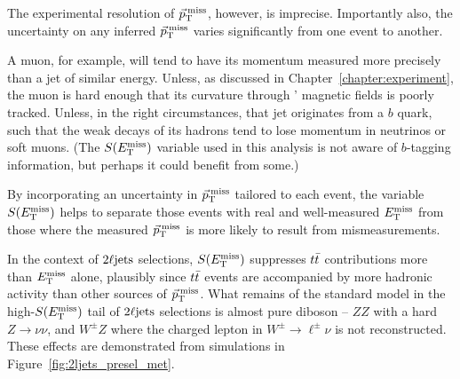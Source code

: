 The experimental resolution of $\ptmiss$, however, is imprecise.
Importantly also, the uncertainty on any inferred $\ptmiss$ varies
significantly from one event to another.

A muon, for example, will tend to have its momentum measured more precisely
than a jet of similar energy.
Unless, as discussed in Chapter~\ref{chapter:experiment}, the muon is hard
enough that its curvature through \atlas' magnetic fields is poorly tracked.
Unless, in the right circumstances, that jet originates from a $b$ quark,
such that the weak decays of its hadrons tend to lose momentum in
neutrinos or soft muons. (The $\metsig$ variable used in this analysis is not
aware of $b$-tagging information, but perhaps it could benefit from some.)

By incorporating an uncertainty in $\ptmiss$ tailored to each event, the
variable $\metsig$ helps to separate those events with real and well-measured
$\met$ from those where the measured $\ptmiss$ is more likely to result from
mismeasurements.

In the context of $\twoljets$ selections, $\metsig$ suppresses $\ttbar$
contributions more than $\met$ alone, plausibly since $\ttbar$ events are
accompanied by more hadronic activity than other sources of $\ptmiss$.
What remains of the standard model in the high-$\metsig$ tail of $\twoljets$
selections is almost pure diboson -- $ZZ$ with a hard $Z\rightarrow \nu\nu$,
and $W^\pm Z$ where the charged lepton in $W^\pm\rightarrow\ell^\pm\nu$
is not reconstructed.
These effects are demonstrated from simulations in
Figure~\ref{fig:2ljets_presel_met}.

